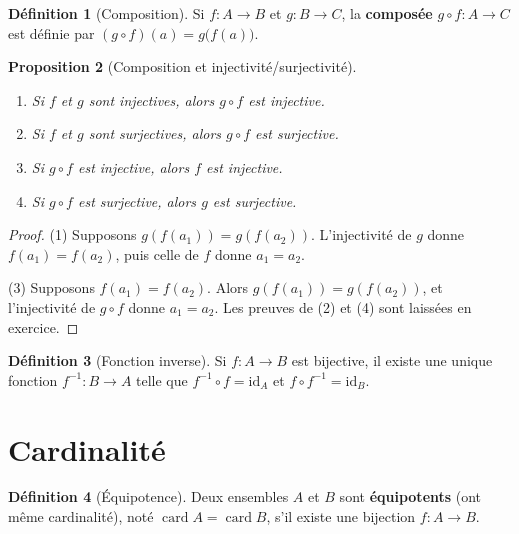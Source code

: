 \documentclass[12pt,a4paper,openany]{book}
\theoremstyle{definition}
\newtheorem{definition}{Définition}[chapter]
\theoremstyle{plain}
\newtheorem{proposition}[definition]{Proposition}
\theoremstyle{remark}
\DeclareMathOperator{\card}{card}
\begin{document}
\begin{definition}[Composition]\label{def:composition}
Si $f \colon A \to B$ et $g \colon B \to C$, la \textbf{composée}
$g \circ f \colon A \to C$ est définie par $(g \circ f)(a) = g\bigl(f(a)\bigr)$.
\end{definition}

\begin{proposition}[Composition et injectivité/surjectivité]\label{prop:comp-inj-surj}
\begin{enumerate}
  \item Si $f$ et $g$ sont injectives, alors $g \circ f$ est injective.
  \item Si $f$ et $g$ sont surjectives, alors $g \circ f$ est surjective.
  \item Si $g \circ f$ est injective, alors $f$ est injective.
  \item Si $g \circ f$ est surjective, alors $g$ est surjective.
\end{enumerate}
\end{proposition}

\begin{proof}
(1) Supposons $g(f(a_1)) = g(f(a_2))$. L'injectivité de $g$ donne
$f(a_1) = f(a_2)$, puis celle de $f$ donne $a_1 = a_2$.

(3) Supposons $f(a_1) = f(a_2)$. Alors $g(f(a_1)) = g(f(a_2))$, et
l'injectivité de $g \circ f$ donne $a_1 = a_2$. Les preuves de (2) et (4)
sont laissées en exercice.
\end{proof}

\begin{definition}[Fonction inverse]\label{def:fonction-inverse}
Si $f \colon A \to B$ est bijective, il existe une unique fonction
$f^{-1} \colon B \to A$ telle que $f^{-1} \circ f = \mathrm{id}_A$ et
$f \circ f^{-1} = \mathrm{id}_B$.
\end{definition}

\section{Cardinalité}\label{sec:cardinalite}

\begin{definition}[Équipotence]\label{def:equipotence}
Deux ensembles $A$ et $B$ sont \textbf{équipotents} (ont même cardinalité),
noté $\card{A} = \card{B}$, s'il existe une bijection $f \colon A \to B$.
\end{definition}
\end{document}
